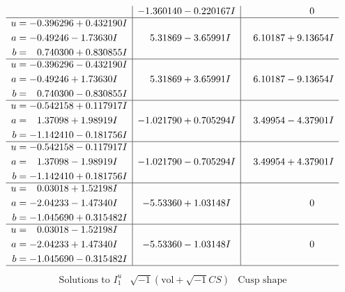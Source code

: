 \documentclass[1p]{elsarticle_modified}
\theoremstyle{definition}
\newcommand{\I}{\sqrt{-1}}
\begin{document}
$$\begin{array}{c|c|c}
 & -1.360140 - 0.220167 I & \phantom{-0.000000 } 0 \\ \hline\begin{aligned}
u &= -0.396296 + 0.432190 I \\
a &= -0.49246 - 1.73630 I \\
b &= \phantom{-}0.740300 + 0.830855 I\end{aligned}
 & \phantom{-}5.31869 - 3.65991 I & \phantom{-}6.10187 + 9.13654 I \\ \hline\begin{aligned}
u &= -0.396296 - 0.432190 I \\
a &= -0.49246 + 1.73630 I \\
b &= \phantom{-}0.740300 - 0.830855 I\end{aligned}
 & \phantom{-}5.31869 + 3.65991 I & \phantom{-}6.10187 - 9.13654 I \\ \hline\begin{aligned}
u &= -0.542158 + 0.117917 I \\
a &= \phantom{-}1.37098 + 1.98919 I \\
b &= -1.142410 - 0.181756 I\end{aligned}
 & -1.021790 + 0.705294 I & \phantom{-}3.49954 - 4.37901 I \\ \hline\begin{aligned}
u &= -0.542158 - 0.117917 I \\
a &= \phantom{-}1.37098 - 1.98919 I \\
b &= -1.142410 + 0.181756 I\end{aligned}
 & -1.021790 - 0.705294 I & \phantom{-}3.49954 + 4.37901 I \\ \hline\begin{aligned}
u &= \phantom{-}0.03018 + 1.52198 I \\
a &= -2.04233 - 1.47340 I \\
b &= -1.045690 + 0.315482 I\end{aligned}
 & -5.53360 + 1.03148 I & \phantom{-0.000000 } 0 \\ \hline\begin{aligned}
u &= \phantom{-}0.03018 - 1.52198 I \\
a &= -2.04233 + 1.47340 I \\
b &= -1.045690 - 0.315482 I\end{aligned}
 & -5.53360 - 1.03148 I & \phantom{-0.000000 } 0\\
 \hline 
 \end{array}$$\newpage$$\begin{array}{c|c|c}  
\text{Solutions to }I^u_{1}& \I (\text{vol} + \sqrt{-1}CS) & \text{Cusp shape}\\

\end{array}$$
\end{document}
